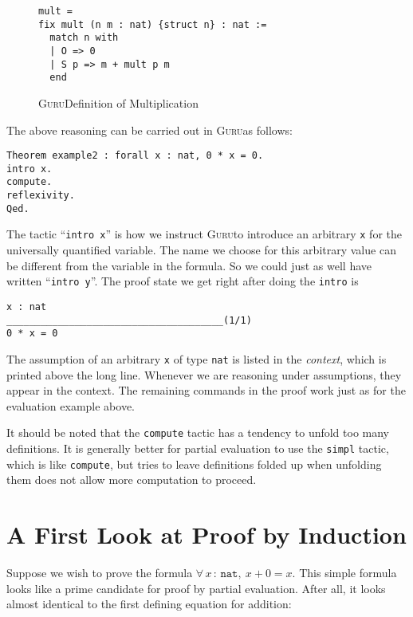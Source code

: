 \documentclass{book}[12pt]
\newcommand{\guru}[0]{\textsc{Guru}}
\begin{document}
\begin{figure}
\begin{verbatim}
mult = 
fix mult (n m : nat) {struct n} : nat :=
  match n with
  | O => 0
  | S p => m + mult p m
  end
\end{verbatim}
\caption{\label{fig:mult}\guru Definition of Multiplication}
\end{figure}

The above reasoning can be carried out in \guru as follows:

\begin{verbatim}
Theorem example2 : forall x : nat, 0 * x = 0.
intro x.
compute.
reflexivity.
Qed.
\end{verbatim}

\noindent The tactic ``\texttt{intro x}'' is how we instruct \guru to
introduce an arbitrary \texttt{x} for the universally quantified
variable.  The name we choose for this arbitrary value can be
different from the variable in the formula.  So we could just as
well have written ``\texttt{intro y}''.  The proof state we get right
after doing the \texttt{intro} is 

\begin{verbatim}
x : nat
______________________________________(1/1)
0 * x = 0
\end{verbatim}

\noindent The assumption of an arbitrary \texttt{x} of type
\texttt{nat} is listed in the \emph{context}, which is printed above
the long line.  Whenever we are reasoning under assumptions, they
appear in the context.  The remaining commands in the proof work just
as for the evaluation example above.

It should be noted that the \texttt{compute} tactic has a tendency to
unfold too many definitions.  It is generally better for partial
evaluation to use the \texttt{simpl} tactic, which is like
\texttt{compute}, but tries to leave definitions folded up when
unfolding them does not allow more computation to proceed.

\section{A First Look at Proof by Induction}

Suppose we wish to prove the formula $\forall\, x\, :\, \texttt{nat},\
x + 0 = x$.  This simple formula looks like a prime candidate for
proof by partial evaluation.  After all, it looks almost identical to
the first defining equation for addition:
\end{document}
